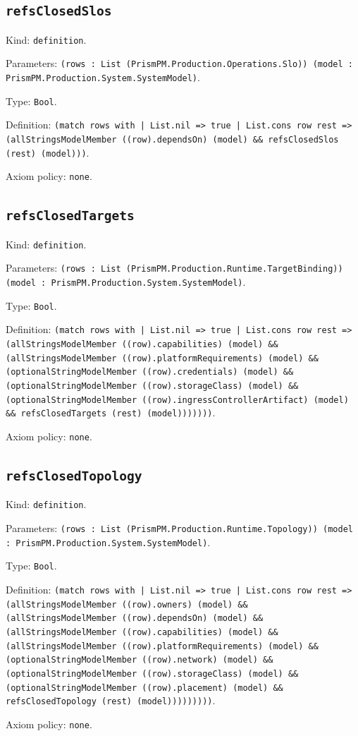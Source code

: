 \documentclass[11pt]{article}
\begin{document}
\subsection*{\texttt{refsClosedSlos}}
\noindent Kind: \texttt{definition}.\par
\noindent Parameters: \texttt{(rows : List (PrismPM.Production.Operations.Slo)) (model : PrismPM.Production.System.SystemModel)}.\par
\noindent Type: \texttt{Bool}.\par
\noindent Definition: \texttt{(match rows with | List.nil => true | List.cons row rest => (allStringsModelMember ((row).dependsOn) (model) \&\& refsClosedSlos (rest) (model)))}.\par
\noindent Axiom policy: \texttt{none}.\par
\subsection*{\texttt{refsClosedTargets}}
\noindent Kind: \texttt{definition}.\par
\noindent Parameters: \texttt{(rows : List (PrismPM.Production.Runtime.TargetBinding)) (model : PrismPM.Production.System.SystemModel)}.\par
\noindent Type: \texttt{Bool}.\par
\noindent Definition: \texttt{(match rows with | List.nil => true | List.cons row rest => (allStringsModelMember ((row).capabilities) (model) \&\& (allStringsModelMember ((row).platformRequirements) (model) \&\& (optionalStringModelMember ((row).credentials) (model) \&\& (optionalStringModelMember ((row).storageClass) (model) \&\& (optionalStringModelMember ((row).ingressControllerArtifact) (model) \&\& refsClosedTargets (rest) (model)))))))}.\par
\noindent Axiom policy: \texttt{none}.\par
\subsection*{\texttt{refsClosedTopology}}
\noindent Kind: \texttt{definition}.\par
\noindent Parameters: \texttt{(rows : List (PrismPM.Production.Runtime.Topology)) (model : PrismPM.Production.System.SystemModel)}.\par
\noindent Type: \texttt{Bool}.\par
\noindent Definition: \texttt{(match rows with | List.nil => true | List.cons row rest => (allStringsModelMember ((row).owners) (model) \&\& (allStringsModelMember ((row).dependsOn) (model) \&\& (allStringsModelMember ((row).capabilities) (model) \&\& (allStringsModelMember ((row).platformRequirements) (model) \&\& (optionalStringModelMember ((row).network) (model) \&\& (optionalStringModelMember ((row).storageClass) (model) \&\& (optionalStringModelMember ((row).placement) (model) \&\& refsClosedTopology (rest) (model)))))))))}.\par
\noindent Axiom policy: \texttt{none}.\par
\end{document}
